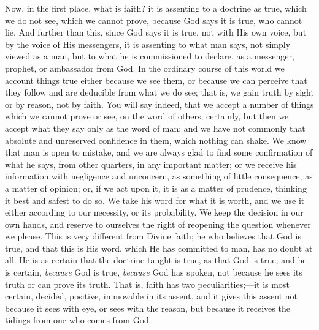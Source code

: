 Now, in the first place, what is faith? it is assenting to a
doctrine as true, which we do not see, which we cannot prove, because
God says it is true, who cannot lie. And further than this, since God
says it is true, not with His own voice, but by the voice of His
messengers, it is assenting to what man says, not simply viewed as a
man, but to what he is commissioned to declare, as a messenger,
prophet, or ambassador from God. In the ordinary course of this world
we account things true either because we see them, or because we can
perceive that they follow and are deducible from what we do see; that
is, we gain truth by sight or by reason, not by faith. You will say
indeed, that we accept a number of things which we cannot prove or
see, on the word of others; certainly, but then we accept what they
say only as the word of man; and we have not commonly that absolute
and unreserved confidence in them, which nothing can shake. We know
that man is open to mistake, and we are always glad to find some
confirmation of what he says, from other quarters, in any important
matter; or we receive his information with negligence and unconcern,
as something of little consequence, as a matter of opinion; or, if we
act upon it, it is as a matter of prudence, thinking it best and
safest to do so. We take his word for what it is worth, and we use it
either according to our necessity, or its probability. We keep the
decision in our own hands, and reserve to ourselves the right of
reopening the question whenever we please. This is very different from
Divine faith; he who believes that God is true, and that this is His
word, which He has committed to man, has no doubt at all. He is as
certain that the doctrine taught is true, as that God is true; and he
is certain, \emph{because} God is true, \emph{because} God has spoken,
not because he sees its truth or can prove its truth. That is, faith
has two peculiarities;—it is most certain, decided, positive,
immovable in its assent, and it gives this assent not because it sees
with eye, or sees with the reason, but because it receives the tidings
from one who comes from God.

